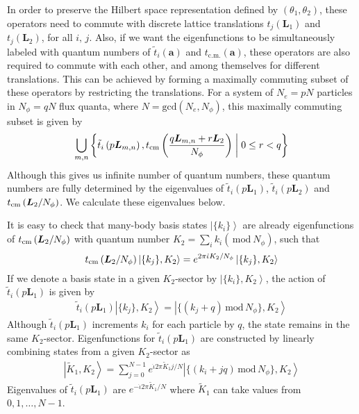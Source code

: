 \documentclass[prb,aps,epsfig,longbibliography,twocolumn]{revtex4-1}
\newcommand{\ket}[1]{\left|#1\right\rangle }
\newcommand{\bsym}[1]{\boldsymbol{#1}}
\newcommand{\rbkt}[1]{\left( #1\right)}
\newcommand{\tcm}[1]{t_{\text{c.m.}} \rbkt{\bsym{#1}}}
\newcommand{\trel}[2]{\tilde{t}_{#1}\rbkt{\bsym{#2}}}
\newcommand{\np}{N_{\phi}}
\newcommand{\iiota}{\dot{\iota}}
\begin{document}
In order to preserve the Hilbert space representation defined by $(\theta_1,\theta_2)$, these operators need to commute with discrete lattice translations $t_j(\bsym{L}_1)$ and $t_j(\bsym{L}_2)$, for all $i,\, j$. Also, if we want the eigenfunctions to be simultaneously labeled with quantum numbers of  $\trel{i}{a}$ and $\tcm{a}$, these operators are also required to commute with each other, and among themselves for different translations. This can be achieved by forming a maximally commuting subset of these operators by restricting the translations. For a system of $N_e=pN$ particles in $\np = qN$ flux quanta, where $N=\text{gcd}(N_e,\np)$, this maximally commuting subset is given by
\begin{equation}\label{eq::2.3}
 \bigcup\limits_{m,n} \left\{
  \tilde{t}_{i}\rbkt{p\bsym{L}_{m,n}},  t_{\rm cm}\rbkt{\frac{q\bsym{L}_{m,n} + r\bsym{L}_{2}}{\np}}\;\middle|\;
   0 \leq r < q
\right\}
\end{equation}
Although this gives us infinite number of quantum numbers,  these quantum numbers  are fully determined by the eigenvalues of ${\tilde{t}}_{i}\rbkt{p\bsym{L}_1}$,  ${\tilde{t}}_{i}\rbkt{p\bsym{L}_2}$  and $t_{\rm cm}\rbkt{ \bsym{L}_{2}/\np}$. We calculate these eigenvalues below.

It is easy to check that many-body basis states $\ket{\{k_i\}}$ are already eigenfunctions of $t_{\rm cm}\rbkt{\bsym{L}_2/\np}$ with quantum number $K_2 = \sum_i k_i(\, \text{mod}\ \np)$, such that
\begin{equation}
t_{\rm cm}\rbkt{\bsym{L}_2/\np} \ket{\{k_j\},{K}_2} =  e^{{2\pi {\iiota}K_2/\np}}\ket{\{k_j\},{K}_2}
\end{equation}
If we denote a basis state in a given ${K}_2$-sector by $\ket{\{k_i\},{K}_2}$, the action of ${\tilde{t}}_{i}\rbkt{p\bsym{L}_1}$ is given by
\begin{gather}
{\tilde{t}}_i (p \bsym{L}_1) \ket{\{k_j\},{K}_2} = \ket{\{(k_j + q)\,\text{mod}\,\np \},{K}_2}\label{eq::2.5}
\end{gather}
Although ${\tilde{t}}_i (p \bsym{L}_1)$ increments $k_i$ for each particle by $q$, the state remains in the same $K_2$-sector. Eigenfunctions for ${\tilde{t}}_i (p \bsym{L}_1)$  are constructed by linearly combining states from a given $K_2$-sector as
\begin{gather} \label{eq::2.6}
\ket{\tilde{K}_1,{K}_2} = \sum_{j=0}^{N-1} e^{{\iiota}2\pi \tilde{K}_1 j/{N}} \ket{\{(k_i + jq)\,\text{mod}\,\np \},{K}_2}
\end{gather}
Eigenvalues of ${\tilde{t}}_i (p \bsym{L}_1)$ are $e^{-{\iiota}2\pi\tilde{K}_1/{N}}$ where $\tilde{K}_1$ can take values from $0,1,\dots,N-1$. 
\end{document}

